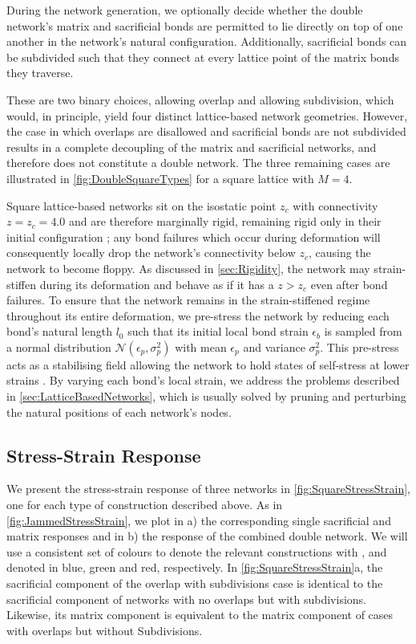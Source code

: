 \begin{subappendices}
During the network generation, we optionally decide whether the double network's matrix and sacrificial bonds are permitted to lie directly on top of one another in the network’s natural configuration. Additionally, sacrificial bonds can be subdivided such that they connect at every lattice point of the matrix bonds they traverse.

These are two binary choices, allowing overlap and allowing subdivision, which would, in principle, yield four distinct lattice-based network geometries. However, the case in which overlaps are disallowed and sacrificial bonds are not subdivided results in a complete decoupling of the matrix and sacrificial networks, and therefore does not constitute a double network. The three remaining cases are illustrated in \cref{fig:DoubleSquareTypes} for a square lattice with $M=4$.

Square lattice-based networks sit on the isostatic point $z_c$ with connectivity $z=z_c=4.0$ and are therefore marginally rigid, remaining rigid only in their initial configuration \cite{Head_marginally_rigid_2022}; any bond failures which occur during deformation will consequently locally drop the network's connectivity below $z_c$, causing the network to become floppy. As discussed in \cref{sec:Rigidity}, the network may strain-stiffen during its deformation and behave as if it has a $z > z_c$ even after bond failures. To ensure that the network remains in the strain-stiffened regime throughout its entire deformation, we pre-stress the network by reducing each bond's natural length $l_0$ such that its initial local bond strain $\epsilon_{b}$ is sampled from a normal distribution $\mathcal{N}(\epsilon_p, \sigma_p^2)$ with mean $\epsilon_p$ and variance $\sigma_p^2$. This pre-stress acts as a stabilising field allowing the network to hold states of self-stress at lower strains \cite{tauber_sharing_2021}. By varying each bond's local strain, we address the problems described in \cref{sec:LatticeBasedNetworks}, which is usually solved by pruning and perturbing the natural positions of each network's nodes. 

\subsection{Stress-Strain Response}

We present the stress-strain response of three networks in \cref{fig:SquareStressStrain}, one for each type of construction described above. As in \cref{fig:JammedStressStrain}, we plot in a) the corresponding single sacrificial and matrix responses and in b) the response of the combined double network. We will use a consistent set of colours to denote the relevant constructions with ,  and  denoted in blue, green and red, respectively. In \cref{fig:SquareStressStrain}a, the sacrificial component of the overlap with subdivisions case is identical to the sacrificial component of networks with no overlaps but with subdivisions. Likewise, its matrix component is equivalent to the matrix component of cases with overlaps but without Subdivisions.


\end{subappendices}
